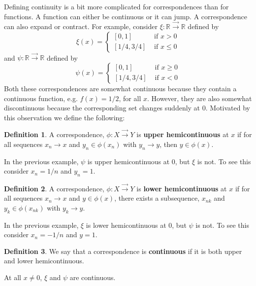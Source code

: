 \documentclass[12pt,reqno]{amsart}
\theoremstyle{definition}
\newtheorem{definition}{Definition}[section]
\def\R{\mathbb{R}}
\renewcommand{\to}{{\rightarrow}}
\newcommand{\corres}{\overrightarrow{\rightarrow}}
\begin{document}
Defining continuity is a bit more complicated for correspondences than
for functions. A function can either be continuous or it can jump. A
correspondence can also expand or contract. For example, consider
$\xi:\R \corres \R$ defined by 
\[ \xi(x) = \begin{cases} 
  [0,1] & \text{ if } x > 0 \\
  [1/4,3/4] & \text{ if } x \leq 0 
\end{cases} \]
and $\psi: \R \corres \R$ defined by
\[ \psi(x) = \begin{cases} 
  [0,1] & \text{ if } x \geq 0 \\
  [1/4,3/4] & \text{ if } x < 0 
\end{cases} \]
Both these correspondences are somewhat continuous because they
contain a continuous function, e.g. $f(x) = 1/2$,  for all
$x$. However, they are also somewhat discontinuous because the
corresponding set changes suddenly at $0$. Motivated by this
observation we define the following:
\begin{definition}
  A correspondence, $\phi: X \corres Y$ is \textbf{upper
    hemicontinuous} at $x$ if for all sequences $x_n \to x$ and $y_n
  \in \phi(x_n)$ with $y_n \to y$, then $y \in \phi(x)$.
\end{definition}
In the previous example, $\psi$ is upper hemicontinuous at $0$, but
$\xi$ is not. To see this consider $x_n = 1/n$ and $y_n = 1$.
\begin{definition}
  A correspondence, $\phi: X \corres Y$ is \textbf{lower
    hemicontinuous} at $x$ if for all sequences $x_n \to x$ and $y \in
  \phi(x)$, there exists a subsequence, $x_{nk}$ and $y_k \in
  \phi(x_{nk})$ with $y_k \to y$.
\end{definition}
In the previous example, $\xi$ is lower hemicontinuous at $0$, but
$\psi$ is not. To see this consider $x_n = -1/n$ and $y = 1$. 
\begin{definition}
  We say that a correspondence is \textbf{continuous} if it is both
  upper and lower hemicontinuous.
\end{definition}
At all $x \neq 0$, $\xi$ and $\psi$ are continuous.
\end{document}
